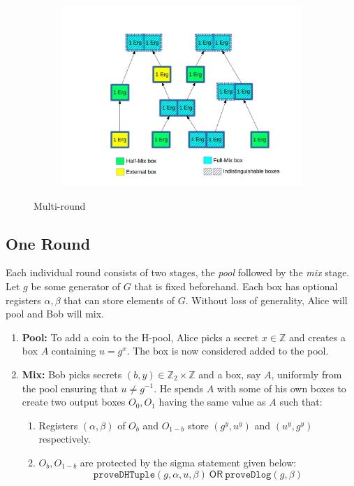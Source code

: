 \documentclass[runningheads]{llncs}
\newcommand{\ornode}{\ensuremath{\mathsf{OR}}}
\begin{document}
\begin{figure}[h]
	\centering
	\begin{subfigure}{.7\textwidth}
		\centering
		\includegraphics[width=\linewidth]{ZeroJoin}
	\end{subfigure}
	\caption{Multi-round \algname}
\label{fig:mixname}
\end{figure}

\subsection{One \algname Round}
Each individual \algname round consists of two stages, the {\em pool} followed by the {\em mix} stage. 
Let $g$ be some generator of $G$ that is fixed beforehand. Each box has optional registers ${\alpha}, {\beta}$ that can store elements of $G$.
Without loss of generality, Alice will pool and Bob will mix. 

\begin{enumerate}
	\item \textbf{Pool:} To add a coin to the H-pool, Alice picks a secret $x\in \mathbb{Z}$ and creates a box $A$ containing $u = g^x$. The box is now considered added to the pool. 
	\item \textbf{Mix:} Bob picks secrets $(b, y) \in \mathbb{Z}_2\times \mathbb{Z}$ and a box, say $A$, uniformly from the pool ensuring that $u\neq g^{-1}$. He spends $A$ with some of his own boxes to create two output boxes $O_0, O_1$ having the same value as $A$ such that:
	\begin{enumerate}
		\item Registers $({\alpha}, {\beta})$ of $O_b$ and $O_{1-b}$ store $(g^y, u^y)$ and $(u^y, g^y)$ respectively. 
		\item $O_b, O_{1-b}$ are protected by the sigma statement given below:
    		\begin{equation}\label{fullScriptEqn}
    		    \texttt{proveDHTuple}(g, {\alpha}, u, {\beta})~\ornode~\texttt{proveDlog}(g, {\beta})
    		\end{equation}
	\end{enumerate}
\end{enumerate}
\end{document}
